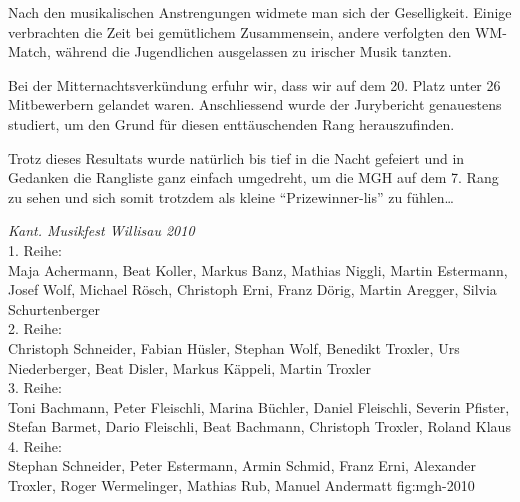 \begin{history}
    Nach den musikalischen Anstrengungen widmete man sich der Geselligkeit.
    Einige verbrachten die Zeit bei gemütlichem Zusammensein, andere verfolgten
    den WM-Match, während die Jugendlichen ausgelassen zu irischer Musik
    tanzten.

    Bei der Mitternachtsverkündung erfuhr wir, dass wir auf dem 20. Platz unter
    26 Mitbewerbern gelandet waren. Anschliessend wurde der  Jurybericht
    genauestens studiert, um den Grund für diesen enttäuschenden Rang
    herauszufinden.

    Trotz dieses Resultats wurde natürlich bis tief in die Nacht gefeiert und in
    Gedanken die Rangliste ganz einfach umgedreht, um die MGH auf dem 7. Rang zu
    sehen und sich somit trotzdem als kleine \enquote{Prizewinner-lis} zu
    fühlen…

\end{history}

{\emph{Kant. Musikfest Willisau 2010}\\
    1. Reihe:\\
    Maja Achermann, Beat Koller, Markus Banz, Mathias Niggli, Martin Estermann,
    Josef Wolf, Michael Rösch, Christoph Erni, Franz Dörig, Martin Aregger,
    Silvia Schurtenberger\\
    2. Reihe:\\
    Christoph Schneider, Fabian Hüsler, Stephan Wolf, Benedikt Troxler, Urs
    Niederberger, Beat Disler, Markus Käppeli, Martin Troxler\\
    3. Reihe:\\
    Toni Bachmann, Peter Fleischli, Marina Büchler, Daniel Fleischli, Severin
    Pfister, Stefan Barmet, Dario Fleischli, Beat Bachmann, Christoph Troxler,
    Roland Klaus\\
    4. Reihe:\\
    Stephan Schneider, Peter Estermann, Armin Schmid, Franz Erni, Alexander
    Troxler, Roger Wermelinger, Mathias Rub, Manuel Andermatt } {fig:mgh-2010}

